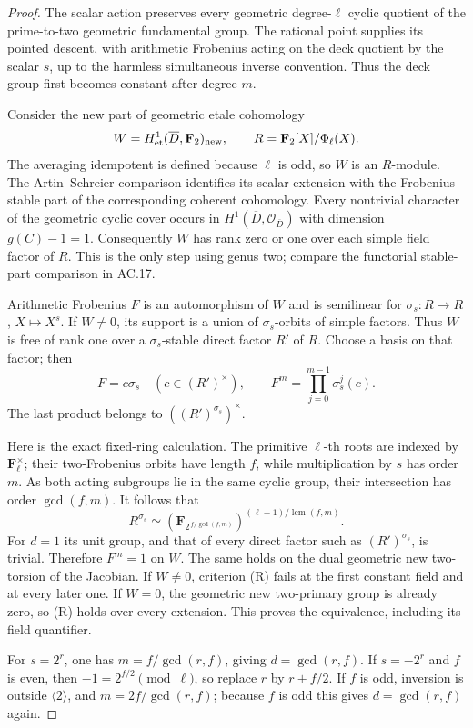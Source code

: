 \begin{proof}
The scalar action preserves every geometric degree-\(\ell\)
cyclic quotient of the prime-to-two geometric fundamental
group. The rational point supplies its pointed descent,
with arithmetic Frobenius acting on the deck quotient
by the scalar \(s\), up to the harmless simultaneous
inverse convention. Thus the deck group first becomes
constant after degree \(m\).

Consider the new part of geometric etale cohomology
\[
 W=H^1_{\rm et}(\overline D,\mathbf F_2)_{\rm new},
 \qquad R=\mathbf F_2[X]/\Phi_\ell(X).
\]
The averaging idempotent is defined because \(\ell\)
is odd, so \(W\) is an \(R\)-module.
The Artin--Schreier comparison identifies its scalar
extension with the Frobenius-stable part of the
corresponding coherent cohomology. Every nontrivial
character of the geometric cyclic cover occurs in
\(H^1(\overline D,\mathcal O_{\overline D})\) with
dimension \(g(C)-1=1\). Consequently \(W\) has rank
zero or one over each simple field factor of \(R\).
This is the only step using genus two; compare the
functorial stable-part comparison in AC.17.

Arithmetic Frobenius \(F\) is an automorphism of \(W\)
and is semilinear for
\(\sigma_s:R\to R\), \(X\mapsto X^s\).
If \(W\ne0\), its support is a union of \(\sigma_s\)-orbits
of simple factors. Thus \(W\) is free of rank one over a
\(\sigma_s\)-stable direct factor \(R'\) of \(R\).
Choose a basis on that factor; then
\[
                 F=c\sigma_s\quad(c\in(R')^\times),
 \qquad
                 F^m=\prod_{j=0}^{m-1}\sigma_s^j(c).
\]
The last product belongs to \(((R')^{\sigma_s})^\times\).

Here is the exact fixed-ring calculation. The primitive
\(\ell\)-th roots are indexed by
\(\mathbf F_\ell^\times\); their two-Frobenius orbits
have length \(f\), while multiplication by \(s\) has
order \(m\). As both acting subgroups lie in the same
cyclic group, their intersection has order \(\gcd(f,m)\).
It follows that
\[
 R^{\sigma_s}\simeq
 \left(\mathbf F_{2^{\,f/\gcd(f,m)}}\right)^{
                    (\ell-1)/\operatorname{lcm}(f,m)}.
\]
For \(d=1\) its unit group, and that of every direct
factor such as \((R')^{\sigma_s}\), is trivial.
Therefore \(F^m=1\) on \(W\).
The same holds on the dual geometric new two-torsion
of the Jacobian. If \(W\ne0\), criterion (R) fails at
the first constant field and at every later one. If
\(W=0\), the geometric new two-primary group is already
zero, so (R) holds over every extension. This proves the
equivalence, including its field quantifier.

For \(s=2^r\), one has \(m=f/\gcd(r,f)\), giving
\(d=\gcd(r,f)\). If \(s=-2^r\) and \(f\) is even,
then \(-1=2^{f/2}\pmod\ell\), so replace \(r\) by
\(r+f/2\). If \(f\) is odd, inversion is outside
\(\langle2\rangle\), and
\(m=2f/\gcd(r,f)\); because \(f\) is odd this gives
\(d=\gcd(r,f)\) again.
\end{proof}

